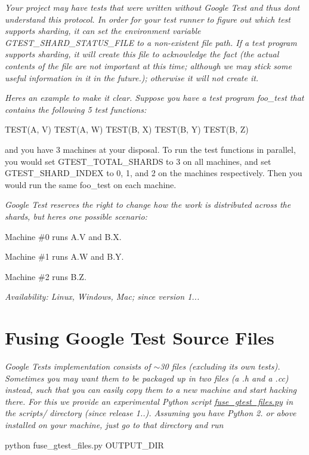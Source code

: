 {\itshape Your project may have tests that were written without Google Test and thus don\textquotesingle{}t understand this protocol. In order for your test runner to figure out which test supports sharding, it can set the environment variable {\ttfamily G\+T\+E\+S\+T\+\_\+\+S\+H\+A\+R\+D\+\_\+\+S\+T\+A\+T\+U\+S\+\_\+\+F\+I\+LE} to a non-\/existent file path. If a test program supports sharding, it will create this file to acknowledge the fact (the actual contents of the file are not important at this time; although we may stick some useful information in it in the future.); otherwise it will not create it.}

{\itshape Here\textquotesingle{}s an example to make it clear. Suppose you have a test program {\ttfamily foo\+\_\+test} that contains the following 5 test functions\+: 
\begin{DoxyCode}
TEST(A, V)
TEST(A, W)
TEST(B, X)
TEST(B, Y)
TEST(B, Z)
\end{DoxyCode}
 and you have 3 machines at your disposal. To run the test functions in parallel, you would set {\ttfamily G\+T\+E\+S\+T\+\_\+\+T\+O\+T\+A\+L\+\_\+\+S\+H\+A\+R\+DS} to 3 on all machines, and set {\ttfamily G\+T\+E\+S\+T\+\_\+\+S\+H\+A\+R\+D\+\_\+\+I\+N\+D\+EX} to 0, 1, and 2 on the machines respectively. Then you would run the same {\ttfamily foo\+\_\+test} on each machine.}

{\itshape Google Test reserves the right to change how the work is distributed across the shards, but here\textquotesingle{}s one possible scenario\+:}

{\itshape 
\begin{DoxyItemize}
\item Machine \#0 runs {\ttfamily A.\+V} and {\ttfamily B.\+X}.
\item Machine \#1 runs {\ttfamily A.\+W} and {\ttfamily B.\+Y}.
\item Machine \#2 runs {\ttfamily B.\+Z}.
\end{DoxyItemize}}

{\itshape {\itshape Availability\+:} Linux, Windows, Mac; since version 1...}

{\itshape \section*{Fusing Google Test Source Files}}

{\itshape }

{\itshape Google Test\textquotesingle{}s implementation consists of $\sim$30 files (excluding its own tests). Sometimes you may want them to be packaged up in two files (a {\ttfamily .h} and a {\ttfamily .cc}) instead, such that you can easily copy them to a new machine and start hacking there. For this we provide an experimental Python script {\ttfamily \hyperlink{fuse__gtest__files_8py}{fuse\+\_\+gtest\+\_\+files.\+py}} in the {\ttfamily scripts/} directory (since release 1..). Assuming you have Python 2. or above installed on your machine, just go to that directory and run 
\begin{DoxyCode}
python fuse\_gtest\_files.py OUTPUT\_DIR
\end{DoxyCode}
}

